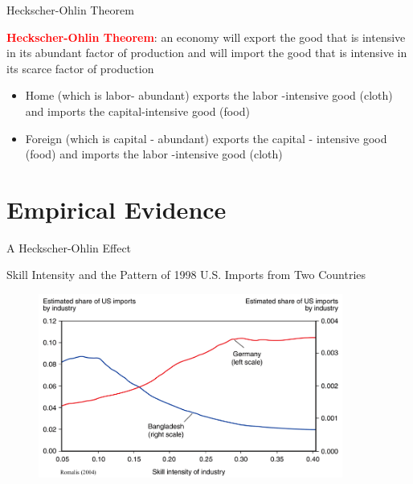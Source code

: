 \documentclass[10pt,hyperref={CJKbookmarks=true},xcolor=dvipsnames,aspectratio=169]{beamer}
\begin{document}
\begin{frame}{Heckscher-Ohlin Theorem}

\begin{theorem}
\textbf{\textcolor{red}{Heckscher-Ohlin Theorem}}: an economy will
export the good that is intensive in its abundant factor of production
and will import the good that is intensive in its scarce factor of
production\end{theorem}

\begin{itemize}
\item Home (which is labor- abundant) exports the labor -intensive good
(cloth) and imports the capital-intensive good (food)
\item Foreign (which is capital - abundant) exports the capital - intensive
good (food) and imports the labor -intensive good (cloth) 
\end{itemize}
\end{frame}



\section{Empirical Evidence}
\begin{frame}{A Heckscher-Ohlin Effect }


Skill Intensity and the Pattern of 1998 U.S. Imports from Two Countries 

\begin{figure}
\begin{centering}
\includegraphics[width=10cm]{fig/ho/lec5-12}
\par\end{centering}

\end{figure}

\end{frame}
\end{document}
